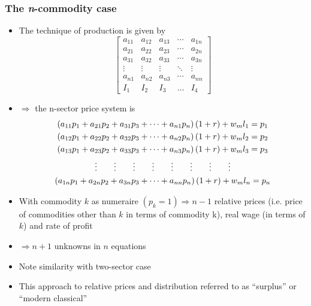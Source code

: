 \documentclass{article}
\begin{document}
\subsubsection{The \textit{n}-commodity case}
	\begin{itemize}
		\item The technique of production is given by
		\[
			\begin{bmatrix}
				a_{11} & a_{12} & a_{13} & \cdots & a_{1n} \\
				a_{21} & a_{22} & a_{23} & \cdots & a_{2n} \\
				a_{31} & a_{32} & a_{33} & \cdots & a_{3n} \\
				\vdots & \vdots & \vdots & \ddots & \vdots \\
				a_{n1} & a_{n2} & a_{n3} & \cdots & a_{nn} \\
				I_1 & I_2 & I_3 & \dots & I_4
			\end{bmatrix}
		\]
		\item \( \Rightarrow \) the n-sector price system is
		\begin{gather}
			\left( a_{11} p_1 + a_{21} p_2 + a_{31} p_3 + \dots + a_{n1} p_n \right) \left( 1 + r \right) + w_m l_1 = p_1 \notag \\ 
			\left( a_{12} p_1 + a_{22} p_2 + a_{32} p_3 + \dots + a_{n2} p_n \right) \left( 1 + r \right) + w_m l_2 = p_2 \notag \\ 
			\left( a_{13} p_1 + a_{23} p_2 + a_{33} p_3 + \dots + a_{n3} p_n \right) \left( 1 + r \right) + w_m l_3 = p_3 \notag \\
			\vdots \qquad \vdots \qquad \vdots \qquad \vdots \qquad \vdots \qquad \vdots \qquad \vdots \qquad \vdots \notag \\
			\left( a_{1n} p_1 + a_{2n} p_2 + a_{3n} p_3 + \dots + a_{nn} p_n \right) \left( 1 + r \right) + w_m l_n = p_n \label{E:2.5}
		\end{gather}
		\item With commodity \( k \) as numeraire \( (p_k = 1) \Rightarrow n-1 \) relative prices (i.e. price of commodities other than \( k \) in terms of commodity k), real wage (in terms of \( k \)) and rate of profit
		\item \( \Rightarrow n+1 \) unknowns in \( n \) equations
		\item Note similarity with two-sector case
		\item This approach to relative prices and distribution referred to as ``\textcolor{myred}{surplus}'' or ``\textcolor{myred}{modern classical}''
		\begin{enumerate}[(i)]

\end{enumerate}
\end{itemize}
\end{document}
